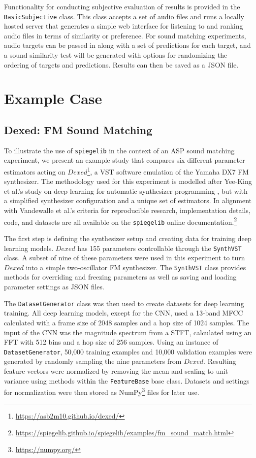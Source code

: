 Functionality for conducting subjective evaluation of results is provided in the \texttt{BasicSubjective} class. This class accepts a set of audio files and runs a locally hosted server that generates a simple web interface for listening to and ranking audio files in terms of similarity or preference. For sound matching experiments, audio targets can be passed in along with a set of predictions for each target, and a sound similarity test will be generated with options for randomizing the ordering of targets and predictions. Results can then be saved as a JSON file.

\section{Example Case}\label{sec:4}
\subsection{Dexed: FM Sound Matching}
To illustrate the use of \texttt{spiegelib} in the context of an ASP sound matching experiment, we present an example study that compares six different parameter estimators acting on $Dexed$\footnote{\url{https://asb2m10.github.io/dexed/}}, a VST software emulation of the Yamaha DX7 FM synthesizer. The methodology used for this experiment is modelled after Yee-King et al.'s study on deep learning for automatic synthesizer programming \cite{yee2018automatic}, but with a simplified synthesizer configuration and a unique set of estimators. In alignment with Vandewalle et al.'s criteria for reproducible research, implementation details, code, and datasets are all available on the \texttt{spiegelib} online documentation.\footnote{\url{https://spiegelib.github.io/spiegelib/examples/fm_sound_match.html}}

The first step is defining the synthesizer setup and creating data for training deep learning models. $Dexed$ has 155 parameters controllable through the \texttt{SynthVST} class. A subset of nine of these parameters were used in this experiment to turn $Dexed$ into a simple two-oscillator FM synthesizer. The \texttt{SynthVST} class provides methods for overriding and freezing parameters as well as saving and loading parameter settings as JSON files.

The \texttt{DatasetGenerator} class was then used to create datasets for deep learning training. All deep learning models, except for the CNN, used a 13-band MFCC calculated with a frame size of 2048 samples and a hop size of 1024 samples. The input of the CNN was the magnitude spectrum from a STFT, calculated using an FFT with 512 bins and a hop size of 256 samples. Using an instance of \texttt{DatasetGenerator}, 50,000 training examples and 10,000 validation examples were generated by randomly sampling the nine parameters from $Dexed$. Resulting feature vectors were normalized by removing the mean and scaling to unit variance using methods within the \texttt{FeatureBase} base class. Datasets and settings for normalization were then stored as NumPy\footnote{\url{https://numpy.org/}} files for later use.

